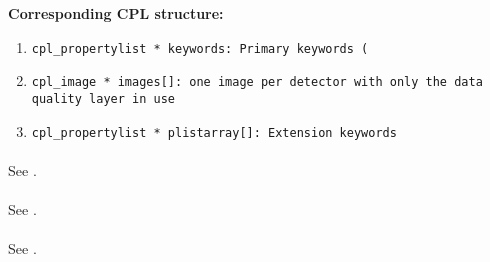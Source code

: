 \begin{datastructdef}
\textbf{Corresponding \ac{CPL} structure:}
\begin{enumerate}
 \item \texttt{cpl\_propertylist * keywords: Primary keywords (}
    \item \texttt{cpl\_image * images[]: one image per detector with only the data quality layer in use}
    \item \texttt{cpl\_propertylist * plistarray[]: Extension keywords}
\end{enumerate}
\end{datastructdef}

\paragraph{}\label{dataitem:badpix_map_2rg}
See .

\paragraph{}\label{dataitem:badpix_map_geo}
See .

\paragraph{}\label{dataitem:badpix_map_ifu}
See .

